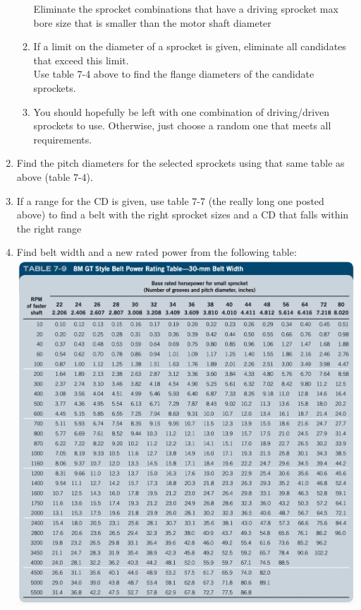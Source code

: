 \documentclass[11pt, fleqn]{article}
\begin{document}
\begin{enumerate}
\begin{enumerate}
        Eliminate the sprocket combinations that have a driving sprocket max bore size that is smaller than the motor shaft diameter\\
        \item If a limit on the diameter of a sprocket is given, eliminate all candidates that exceed this limit.\\
        Use table 7-4 above to find the flange diameters of the candidate sprockets.
        \item You should hopefully be left with one combination of driving/driven sprockets to use. Otherwise, just choose a random one that meets all requirements.
    \end{enumerate}
    \item Find the pitch diameters for the selected sprockets using that same table as above (table 7-4).
    \item If a range for the CD is given, use table 7-7 (the really long one posted above) to find a belt with the right sprocket sizes and a CD that falls within the right range
    \item Find belt width and a new rated power from the following table:\\
    \includegraphics[scale=0.3]{Belts/7-10_pt1.png}\\

\end{enumerate}
\end{document}
